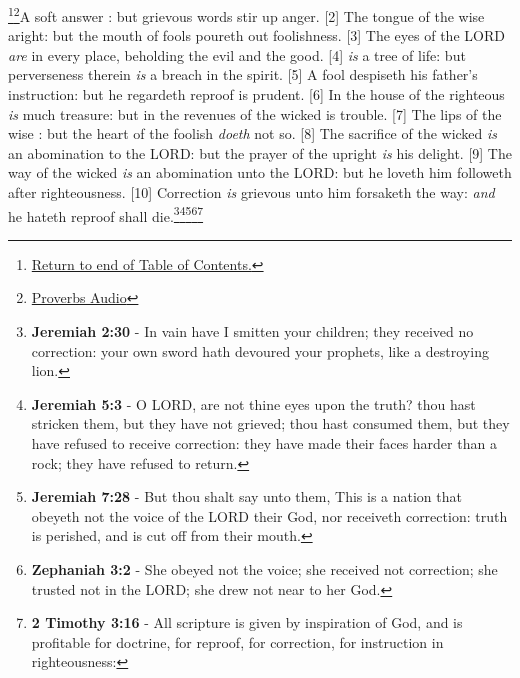 \footnote{\textcolor[cmyk]{0.99998,1,0,0}{\hyperlink{TOC}{Return to end of Table of Contents.}}}\footnote{\href{https://www.audioverse.org/english/audiobibles/books/ENGKJV/O/Prov/1}{\textcolor[cmyk]{0.99998,1,0,0}{Proverbs Audio}}}\textcolor[cmyk]{0.99998,1,0,0}{A soft answer : but grievous words stir up anger.}
[2] \textcolor[cmyk]{0.99998,1,0,0}{The tongue of the wise  aright: but the mouth of fools poureth out foolishness.}
[3] \textcolor[cmyk]{0.99998,1,0,0}{The eyes of the LORD \emph{are} in every place, beholding the evil and the good.}
[4] \textcolor[cmyk]{0.99998,1,0,0}{ \emph{is} a tree of life: but perverseness therein \emph{is} a breach in the spirit.}
[5] \textcolor[cmyk]{0.99998,1,0,0}{A fool despiseth his father's instruction: but he  regardeth reproof is prudent.}
[6] \textcolor[cmyk]{0.99998,1,0,0}{In the house of the righteous \emph{is} much treasure: but in the revenues of the wicked is trouble.}
[7] \textcolor[cmyk]{0.99998,1,0,0}{The lips of the wise : but the heart of the foolish \emph{doeth} not so.}
[8] \textcolor[cmyk]{0.99998,1,0,0}{The sacrifice of the wicked \emph{is} an abomination to the LORD: but the prayer of the upright \emph{is} his delight.}
[9] \textcolor[cmyk]{0.99998,1,0,0}{The way of the wicked \emph{is} an abomination unto the LORD: but he loveth him  followeth after righteousness.}
[10] \textcolor[cmyk]{0.99998,1,0,0}{Correction \emph{is} grievous unto him  forsaketh the way: \emph{and} he  hateth reproof shall die.}\footnote{\textbf{Jeremiah 2:30} - In vain have I smitten your children; they received no correction: your own sword hath devoured your prophets, like a destroying lion.}\footnote{\textbf{Jeremiah 5:3} - O LORD, are not thine eyes upon the truth? thou hast stricken them, but they have not grieved; thou hast consumed them, but they have refused to receive correction: they have made their faces harder than a rock; they have refused to return.}\footnote{\textbf{Jeremiah 7:28} - But thou shalt say unto them, This is a nation that obeyeth not the voice of the LORD their God, nor receiveth correction: truth is perished, and is cut off from their mouth.}\footnote{\textbf{Zephaniah 3:2} - She obeyed not the voice; she received not correction; she trusted not in the LORD; she drew not near to her God.}\footnote{\textbf{2 Timothy 3:16} - All scripture is given by inspiration of God, and is profitable for doctrine, for reproof, for correction, for instruction in righteousness:}
